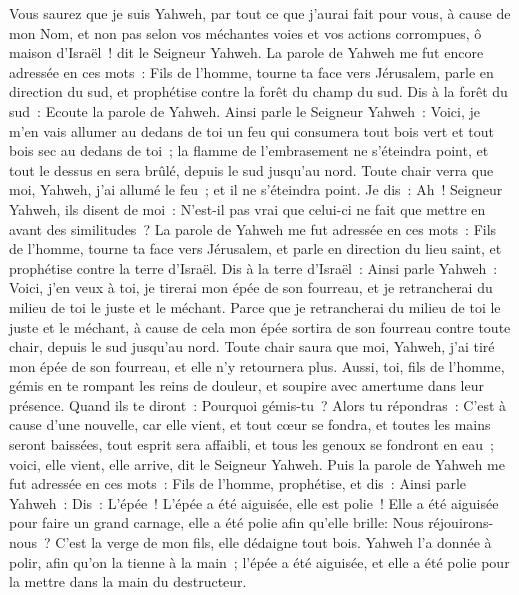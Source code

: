 \begin{multicols}{2}
Vous saurez que je suis Yahweh, par tout ce que j'aurai fait pour vous, à cause de mon Nom, et non pas selon vos méchantes voies et vos actions corrompues, ô maison d'Israël~! dit le Seigneur Yahweh.
\VerseOne{}La parole de Yahweh me fut encore adressée en ces mots~:
Fils de l'homme, tourne ta face vers Jérusalem, parle en direction du sud, et prophétise contre la forêt du champ du sud.
Dis à la forêt du sud~: Ecoute la parole de Yahweh. Ainsi parle le Seigneur Yahweh~: Voici, je m'en vais allumer au dedans de toi un feu qui consumera tout bois vert et tout bois sec au dedans de toi~; la flamme de l'embrasement ne s'éteindra point, et tout le dessus en sera brûlé, depuis le sud jusqu'au nord.
Toute chair verra que moi, Yahweh, j'ai allumé le feu~; et il ne s'éteindra point.
Je dis~: Ah~! Seigneur Yahweh, ils disent de moi~: N'est-il pas vrai que celui-ci ne fait que mettre en avant des similitudes~?
La parole de Yahweh me fut adressée en ces mots~:
Fils de l'homme, tourne ta face vers Jérusalem, et parle en direction du lieu saint, et prophétise contre la terre d'Israël.
Dis à la terre d'Israël~: Ainsi parle Yahweh~: Voici, j'en veux à toi, je tirerai mon épée de son fourreau, et je retrancherai du milieu de toi le juste et le méchant.
Parce que je retrancherai du milieu de toi le juste et le méchant, à cause de cela mon épée sortira de son fourreau contre toute chair, depuis le sud jusqu'au nord.
Toute chair saura que moi, Yahweh, j'ai tiré mon épée de son fourreau, et elle n'y retournera plus.
Aussi, toi, fils de l'homme, gémis en te rompant les reins de douleur, et soupire avec amertume dans leur présence.
Quand ils te diront~: Pourquoi gémis-tu~? Alors tu répondras~: C'est à cause d'une nouvelle, car elle vient, et tout cœur se fondra, et toutes les mains seront baissées, tout esprit sera affaibli, et tous les genoux se fondront en eau~; voici, elle vient, elle arrive, dit le Seigneur Yahweh.
Puis la parole de Yahweh me fut adressée en ces mots~:
Fils de l'homme, prophétise, et dis~: Ainsi parle Yahweh~: Dis~: L'épée~! L'épée a été aiguisée, elle est polie~!
Elle a été aiguisée pour faire un grand carnage, elle a été polie afin qu'elle brille: Nous réjouirons-nous~? C'est la verge de mon fils, elle dédaigne tout bois.
Yahweh l'a donnée à polir, afin qu'on la tienne à la main~; l'épée a été aiguisée, et elle a été polie pour la mettre dans la main du destructeur.

\end{multicols}
